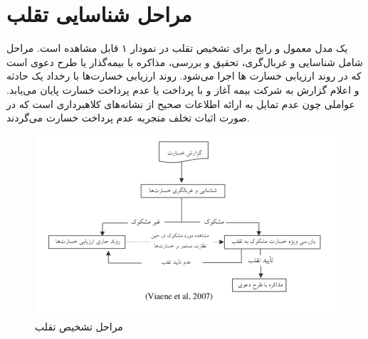 \documentclass[paper=a4, fontsize=11pt]{article}
\numberwithin{equation}{section} %
\numberwithin{figure}{section} %
\numberwithin{table}{section} %
\begin{document}
\newpage
\section{مراحل شناسایی تقلب}
یک مدل معمول و رایج برای تشخیص تقلب در نمودار ۱ قابل مشاهده است.
مراحل شامل شناسایی و غربال‌گری، تحقیق و بررسی، مذاکره با بیمه‌گذار یا طرح دعوی است که در روند ارزیابی خسارت ها اجرا می‌شود. روند ارزیابی خسارت‌ها با رخداد یک حادثه و اعلام گزارش به شرکت بیمه آغاز و با پرداخت یا عدم پرداخت خسارت پایان می‌یابد. عواملی چون عدم تمایل به ارائه اطلاعات صحیح از نشانه‌های کلاهبرداری است که در صورت اثبات تخلف منجر‌به عدم پرداخت خسارت می‌گردند.

\begin{figure}[h]
    \centering
    \includegraphics[scale=1]{model}
    \caption{مراحل تشخیص تقلب}
    \label{fig:model}
\end{figure}
\end{document}

